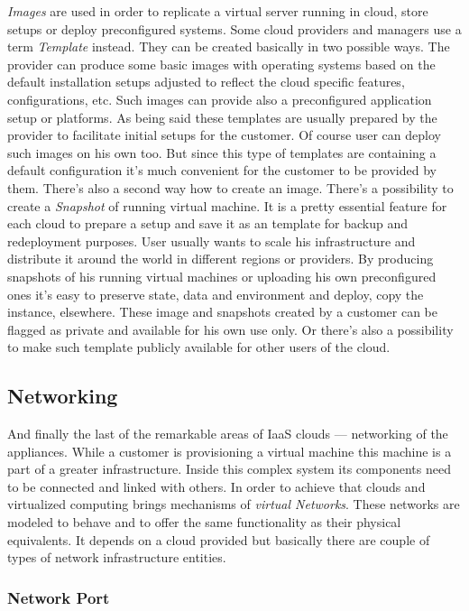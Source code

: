 \emph{Images} are used in order to replicate a virtual server running in cloud, store setups or deploy preconfigured systems. Some cloud providers and managers use a term \emph{Template} instead. They can be created basically in two possible ways. The provider can produce some basic images with operating systems based on the default installation setups adjusted to reflect the cloud specific features, configurations, etc. Such images can provide also a preconfigured application setup or platforms. As being said these templates are usually prepared by the provider to facilitate initial setups for the customer. Of course user can deploy such images on his own too. But since this type of templates are containing a default configuration it's much convenient for the customer to be provided by them. There's also a second way how to create an image. There's a possibility to create a \emph{Snapshot} of running virtual machine. It is a pretty essential feature for each cloud to prepare a setup and save it as an template for backup and redeployment purposes. User usually wants to scale his infrastructure and distribute it around the world in different regions or providers. By producing snapshots of his running virtual machines or uploading his own preconfigured ones it's easy to preserve state, data and environment and deploy, copy the instance, elsewhere. These image and snapshots created by a customer can be flagged as private and available for his own use only. Or there's also a possibility to make such template publicly available for other users of the cloud.

\subsection{Networking}
\label{sub:Networking}

And finally the last of the remarkable areas of IaaS clouds --- networking of the appliances. While a customer is provisioning a virtual machine this machine is a part of a greater infrastructure. Inside this complex system its components need to be connected and linked with others. In order to achieve that clouds and virtualized computing brings mechanisms of \emph{virtual Networks}. These networks are modeled to behave and to offer the same functionality as their physical equivalents. It depends on a cloud provided but basically there are couple of types of network infrastructure entities.

\subsubsection{Network Port}
\label{subs:Network Port}

